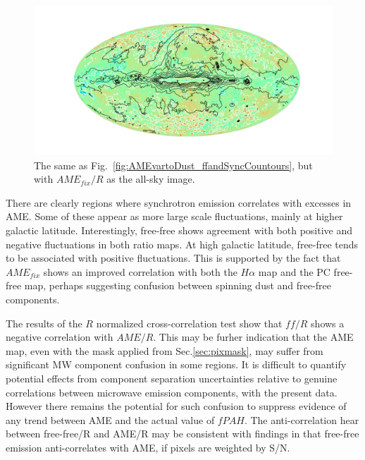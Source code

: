                 \begin{figure}
                    \includegraphics[width=\textwidth]{../Plots/ch_allsky/AMEfixtoDust_ffandSyncCountours.pdf}
                    \centering
                    \caption{The same as Fig.~\ref{fig:AMEvartoDust_ffandSyncCountours}, but with $AME_{fix}/R$ as the all-sky image.}
                    \label{fig:AMEfixtoDust_ffandSyncCountours}
                \end{figure}
             There are clearly regions where synchrotron emission correlates with excesses in AME. Some of these appear as more large scale fluctuations, mainly at higher galactic latitude. Interestingly, free-free shows agreement with both positive and negative fluctuations in both ratio maps. At high galactic latitude, free-free tends to be associated with positive fluctuations. This is supported by the fact that $AME_{fix}$ shows an improved correlation with both the $H\alpha{}$ map and the PC free-free map, perhaps suggesting confusion between spinning dust and free-free components.

             The results of the $R$ normalized cross-correlation test show that $ff/R$ shows a negative correlation with $AME/R$. This may be furher indication that the AME map, even with the mask applied from Sec.\ref{sec:pixmask}, may suffer from significant MW component confusion in some regions. It is difficult to quantify potential effects from component separation uncertainties relative to genuine correlations between microwave emission components, with the present data. However there remains the potential for such confusion to suppress evidence of any trend between AME and the actual value of $fPAH$.  The anti-correlation hear between free-free/R and AME/R may be consistent with findings in \cite{vonHausegger15} that free-free emission anti-correlates with AME, if pixels are weighted by S/N.

